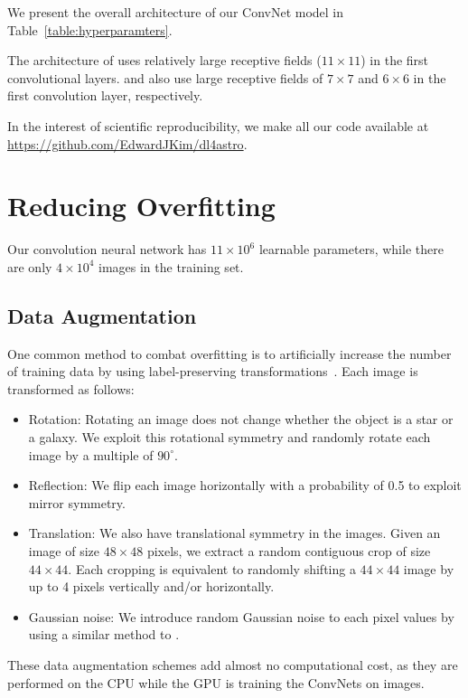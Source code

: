 \documentclass[fleqn,usenatbib]{mnras}
\begin{document}
We present the overall architecture of our ConvNet model in Table~\ref{table:hyperparamters}.

The architecture of \cite{krizhevsky2012imagenet}
uses relatively large receptive fields ($11\times11$) in the first convolutional layers.
\citet{zeiler2014visualizing} and \cite{dieleman2015rotation}
also use large receptive fields of $7\times7$ and $6\times6$
in the first convolution layer, respectively.

In the interest of scientific reproducibility, we make all our code available
at \href{https://github.com/EdwardJKim/dl4astro}{https://github.com/EdwardJKim/dl4astro}.


\section{Reducing Overfitting}
  \label{sec:overfitting}
  
Our convolution neural network has $11\times10^6$ learnable parameters,
while there are only $4\times10^4$ images in the training set.

\subsection{Data Augmentation}
  \label{sec:data_augmentation}
  
One common method to combat overfitting is to artificially increase
the number of training data by using label-preserving
transformations~\citep{krizhevsky2012imagenet,dieleman2015rotation,dieleman2016exploiting}.
Each image is transformed as follows:
\begin{itemize}
\item{Rotation: 
Rotating an image does not change whether the object is a star or a galaxy.
We exploit this rotational symmetry and randomly rotate each image by a multiple of
$90^{\circ}$. }

\item{Reflection:
We flip each image horizontally with a probability of 0.5 to exploit mirror symmetry. }
\item{Translation:
We also have translational symmetry in the images.
Given an image of size $48\times48$ pixels, we extract a random contiguous crop
of size $44\times44$.
Each cropping is equivalent to randomly shifting a $44\times44$ image by up to 4 pixels
vertically and/or horizontally. }
\item{Gaussian noise:
We introduce random Gaussian noise to each pixel values
by using a similar method to \cite{krizhevsky2012imagenet}. }
\end{itemize}
These data augmentation schemes add almost no computational cost,
as they are performed on the CPU while the GPU is training the ConvNets on images.
\end{document}
